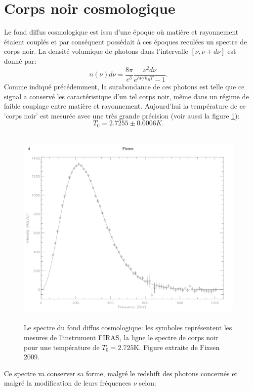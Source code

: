 \section{Corps noir cosmologique}
Le fond diffus cosmologique est issu d'une époque où matière et rayonnement étaient couplés et par conséquent possédait à ces époques reculées un spectre de corps noir. La densité volumique de photons dans l'intervalle $[\nu,\nu+d\nu]$ est donné par:
\begin{equation}
n(\nu)d\nu=\frac{8\pi}{c^3}\frac{\nu^2d\nu}{e^{h\nu/k_BT}-1}.
\end{equation}
Comme indiqué précédemment, la surabondance de ces photons est telle que ce signal a conservé les caractéristique d'un tel corps noir, même dans un régime de faible couplage entre matière et rayonnement. Aujourd'hui la température de ce 'corps noir' est mesurée avec une très grande précision (voir aussi la figure \ref{f:bb}):
\begin{equation}
T_0=2.7255\pm0.0006 K.
\end{equation}
\begin{figure}[htbp]
	\centering
		\includegraphics[height=10cm]{figs/bb.png}
		\caption[Le spectre du fond diffus cosmologique]{Le spectre du fond diffus cosmologique: les symboles représentent les mesures de l'instrument FIRAS, la ligne le spectre de corps noir pour une température de $T_0=2.725$K. Figure extraite de Fixsen 2009.}
	\label{f:bb}
\end{figure}
Ce spectre va conserver sa forme, malgré le redshift des photons concernés et malgré la modification de leurs fréquences $\nu$ selon:

